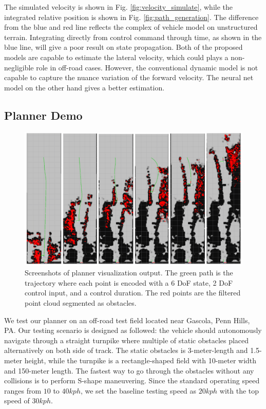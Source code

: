 \documentclass[../thesis.tex]{subfiles}
\begin{document}
The simulated velocity is shown in Fig. \ref{fig:velocity_simulate}, while the integrated relative position is shown in Fig. \ref{fig:path_generation}. The difference from the blue and red line reflects the complex of vehicle model on unstructured terrain. Integrating directly from control command through time, as shown in the blue line, will give a poor result on state propagation. Both of the proposed models are capable to estimate the lateral velocity, which could plays a non-negligible role in off-road cases. However, the conventional dynamic model is not capable to capture the nuance variation of the forward velocity. The neural net model on the other hand gives a better estimation.


\subsection{Planner Demo}

\begin{figure}[t]
	\begin{center}
		\centerline{\includegraphics[width=0.8\columnwidth]{./RRTPlanner/fig/demo.png}}
		\caption{Screenshots of planner visualization output. The green path is the trajectory where each point is encoded with a 6 DoF state, 2 DoF control input, and a control duration. The red points are the filtered point cloud segmented as obstacles.}
		\label{fig:demo}
	\end{center}
\end{figure} 

We test our planner on an off-road test field located near Gascola, Penn Hills, PA. 
Our testing scenario is designed as followed: the vehicle should autonomously navigate through a straight turnpike where multiple of static obstacles placed alternatively on both side of track. The static obstacles is 3-meter-length and 1.5-meter height, while the turnpike is a rectangle-shaped field with 10-meter width and 150-meter length. The fastest way to go through the obstacles without any collisions is to perform S-shape maneuvering. Since the standard operating speed ranges from $10$ to $40 kph$, we set the baseline testing speed as $20 kph$ with the top speed of $30 kph$.
\end{document}
